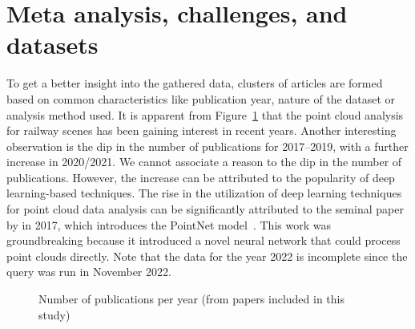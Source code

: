 \section{Meta analysis, challenges, and datasets}\label{sec:stoa:metaanalysis}
To get a better insight into the gathered data, clusters of articles are formed based on common characteristics like publication year, nature of the dataset or analysis method used. 
It is apparent from Figure~\ref{fig:stoa:publication_over_year} that the point cloud analysis for railway scenes has been gaining interest in recent years. Another interesting observation is the dip in the number of publications for 2017--2019, with a further increase in 2020/2021. We cannot associate a reason to the dip in the number of publications. However, the increase can be attributed to the popularity of deep learning-based techniques. The rise in the utilization of deep learning techniques for point cloud data analysis can be significantly attributed to the seminal paper by \citeauthor{qi2017pointnet} in 2017, which introduces the PointNet model~\cite{qi2017pointnet}. This work was groundbreaking because it introduced a novel neural network that could process point clouds directly. Note that the data for the year 2022 is incomplete since the query was run in November 2022. 
\begin{figure}
    \centering
    \caption{Number of publications per year (from papers included in this study)}
    \label{fig:stoa:publication_over_year}
\end{figure}

